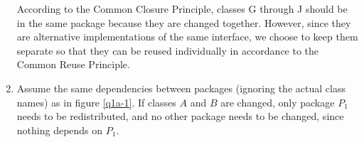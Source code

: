 \documentclass{article}
\begin{document}
\begin{enumerate}[label=\alph*.]
		According to the Common Closure Principle, classes G through J should be in the same package because they are changed together. However, since they are alternative implementations of the same interface, we choose to keep them separate so that they can be reused individually in accordance to the Common Reuse Principle.

	\item
		Assume the same dependencies between packages (ignoring the actual class names) as in figure \ref{q1a-1}. If classes \(A\) and \(B\) are changed, only package \(P_1\) needs to be redistributed, and no other package needs to be changed, since nothing depends on \(P_1\).

\end{enumerate}
\end{document}
